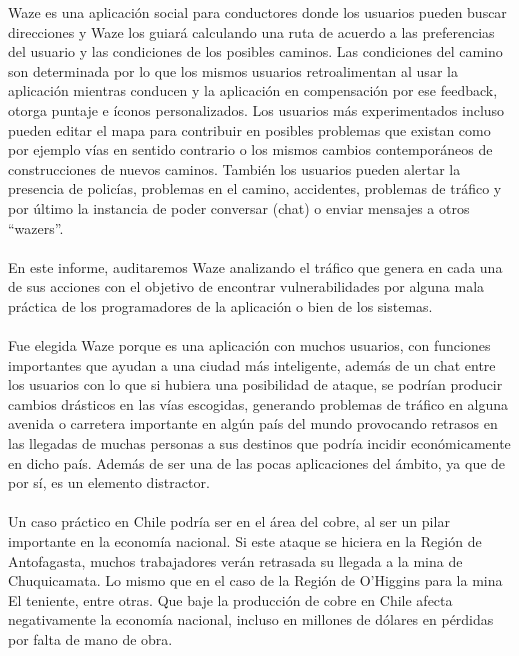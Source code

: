 Waze es una aplicación social para conductores donde los usuarios pueden buscar direcciones y Waze los guiará calculando una ruta de acuerdo a las preferencias del usuario y las condiciones de los posibles caminos. Las condiciones del camino son determinada por lo que los mismos usuarios retroalimentan al usar la aplicación mientras conducen y la aplicación en compensación por ese feedback, otorga puntaje e íconos personalizados. Los usuarios más experimentados incluso pueden editar el mapa para contribuir en posibles problemas que existan como por ejemplo vías en sentido contrario o los mismos cambios contemporáneos de construcciones de nuevos caminos. También los usuarios pueden alertar la presencia de policías, problemas en el camino, accidentes, problemas de tráfico y por último la instancia de poder conversar (chat) o enviar mensajes a otros “wazers”.
\\\\
En este informe, auditaremos Waze analizando el tráfico que genera en cada una de sus acciones con el objetivo de encontrar vulnerabilidades por alguna mala práctica de los programadores de la aplicación o bien de los sistemas. 
\\\\
Fue elegida Waze porque es una aplicación con muchos usuarios, con funciones importantes que ayudan a una ciudad más inteligente, además de un chat entre los usuarios con lo que si hubiera una posibilidad de ataque, se podrían producir cambios drásticos en las vías escogidas, generando problemas de tráfico en alguna avenida o carretera importante en algún país del mundo provocando retrasos en las llegadas de muchas personas a sus destinos que podría incidir económicamente en dicho país. Además de ser una de las pocas aplicaciones del ámbito, ya que de por sí, es un elemento distractor.
\\\\
Un caso práctico en Chile podría ser en el área del cobre, al ser un pilar importante en la economía nacional. Si este ataque se hiciera en la Región de Antofagasta, muchos trabajadores verán retrasada su llegada a la mina de Chuquicamata. Lo mismo que en el caso de la Región de O'Higgins para la mina El teniente, entre otras. Que baje la producción de cobre en Chile afecta negativamente la economía nacional, incluso en millones de dólares en pérdidas por falta de mano de obra.
